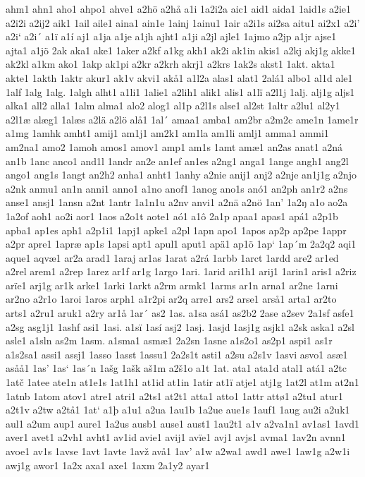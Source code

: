 ahm1
ahn1
aho1
ahpo1
ahve1
a2hö
a2hå
a1i
1a2i2a
aic1
aid1
aida1
1aid1s
a2ie1
a2i2i
a2ij2
aik1
1ail
aile1
aina1
ain1e
1ainj
1ainu1
1air
a2i1s
ai2sa
aitu1
ai2x1
a2i'
a2i`
a2i´
a1ï
a1í
aj1
a1ja
a1je
a1jh
ajht1
a1ji
a2jl
ajle1
1ajmo
a2jp
a1jr
ajse1
ajta1
a1jö
2ak
aka1
ake1
1aker
a2kf
a1kg
akh1
ak2i
ak1in
akis1
a2kj
akj1g
akke1
ak2kl
a1km
ako1
1akp
ak1pi
a2kr
a2krh
akrj1
a2krs
1ak2s
akst1
1akt.
akta1
akte1
1akth
1aktr
akur1
ak1v
akvi1
akå1
a1l2a
alas1
alat1
2alá1
albo1
al1d
ale1
1alf
1alg
1alg.
1algh
alht1
a1li1
1alie1
a2lih1
alik1
alis1
a1lï
a2l1j
1alj.
alj1g
aljs1
alka1
all2
alla1
1alm
alma1
alo2
alog1
al1p
a2l1s
alse1
al2st
1altr
a2lu1
al2y1
a2l1æ
alæg1
1alæs
a2lä
a2lö
alå1
1al´
amaa1
amba1
am2br
a2m2c
ame1n
1ame1r
a1mg
1amhk
amht1
amij1
am1j1
am2k1
am1la
am1li
amlj1
amma1
ammi1
am2na1
amo2
1amoh
amos1
amov1
amp1
am1s
1amt
amæ1
an2as
anat1
a2ná
an1b
1anc
anco1
and1l
1andr
an2e
an1ef
an1es
a2ng1
anga1
1ange
angh1
ang2l
ango1
ang1s
1angt
an2h2
anha1
anht1
1anhy
a2nie
anij1
anj2
a2nje
an1j1g
a2njo
a2nk
anmu1
an1n
anni1
anno1
a1no
anof1
1anog
ano1s
anó1
an2ph
an1r2
a2ns
anse1
ansj1
1ansn
a2nt
1antr
1a1n1u
a2nv
anvi1
a2nä
a2nö
1an'
1a2ŋ
a1o
ao2a
1a2of
aoh1
ao2i
aor1
1aos
a2o1t
aote1
aó1
a1ô
2a1p
apaa1
apas1
apá1
a2p1b
apba1
ap1es
aph1
a2p1i1
1apj1
apke1
a2pl
1apn
apo1
1apos
ap2p
ap2pe
1appr
a2pr
apre1
1apræ
ap1s
1apsi
apt1
apul1
aput1
apä1
ap1ö
1ap`
1ap´m
2a2q2
aqi1
aque1
aqvæ1
ar2a
arad1
1araj
ar1as
1arat
a2rá
1arbb
1arct
1ardd
are2
ar1ed
a2rel
arem1
a2rep
1arez
ar1f
ar1g
1argo
1ari.
1arid
ari1h1
arij1
1arin1
aris1
a2riz
arïe1
arj1g
ar1k
arke1
1arki
1arkt
a2rm
armk1
1arms
ar1n
arna1
ar2ne
1arni
ar2no
a2r1o
1aroi
1aros
arph1
a1r2pi
ar2q
arre1
ars2
arse1
arså1
arta1
ar2to
arts1
a2ru1
aruk1
a2ry
ar1å
1ar´
as2
1as.
a1sa
asá1
as2b2
2ase
a2sev
2a1sf
asfe1
a2sg
asg1j1
1ashf
asi1
1asi.
a1sï
1así
asj2
1asj.
1asjd
1asj1g
asjk1
a2sk
aska1
a2sl
asle1
a1sln
as2m
1asm.
a1sma1
asmæ1
2a2sn
1asne
a1s2o1
as2p1
aspi1
as1r
a1s2sa1
assi1
assj1
1asso
1asst
1assu1
2a2s1t
asti1
a2su
a2s1v
1asvi
asvo1
asæ1
asåå1
1as'
1as`
1as´n
1ašg
1ašk
aš1m
a2š1o
a1t
1at.
ata1
ata1d
atal1
atá1
a2tc
1atč
1atee
ate1n
at1e1s
1at1h1
at1id
at1in
1atir
at1ï
atje1
atj1g
1at2l
at1m
at2n1
1atnb
1atom
atov1
atre1
atri1
a2ts1
at2t1
atta1
atto1
1attr
attø1
a2tu1
atur1
a2t1v
a2tw
a2tå1
1at`
a1þ
a1u1
a2ua
1au1b
1a2ue
aue1s
1auf1
1aug
au2i
a2uk1
aul1
a2um
aup1
aure1
1a2us
ausb1
ause1
aust1
1au2t1
a1v
a2va1n1
av1as1
1avd1
aver1
avet1
a2vh1
avht1
av1id
avie1
avij1
avïe1
avj1
avjs1
avma1
1av2n
avnn1
avoe1
av1s
1avse
1avt
1avte
1avž
avå1
1av'
a1w
a2wa1
awd1
awe1
1aw1g
a2w1i
awj1g
awor1
1a2x
axa1
axe1
1axm
2a1y2
ayar1
